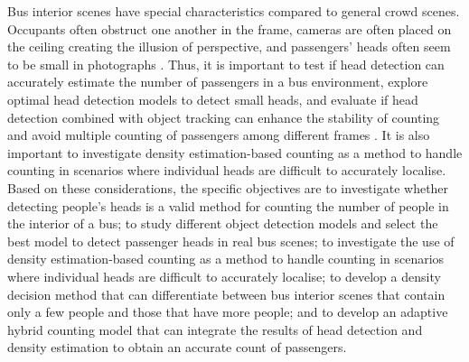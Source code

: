 Bus interior scenes have special characteristics compared to general crowd scenes. Occupants often obstruct one another in the frame, cameras are often placed on the ceiling creating the illusion of perspective, and passengers' heads often seem to be small in photographs \cite{tezcan2024fisheye}. Thus, it is important to test if head detection can accurately estimate the number of passengers in a bus environment, explore optimal head detection models to detect small heads, and evaluate if head detection combined with object tracking can enhance the stability of counting and avoid multiple counting of passengers among different frames \cite{occupancy2026mot}. It is also important to investigate density estimation-based counting as a method to handle counting in scenarios where individual heads are difficult to accurately localise. Based on these considerations, the specific objectives are to investigate whether detecting people's heads is a valid method for counting the number of people in the interior of a bus; to study different object detection models and select the best model to detect passenger heads in real bus scenes; to investigate the use of density estimation-based counting as a method to handle counting in scenarios where individual heads are difficult to accurately localise; to develop a density decision method that can differentiate between bus interior scenes that contain only a few people and those that have more people; and to develop an adaptive hybrid counting model that can integrate the results of head detection and density estimation to obtain an accurate count of passengers.